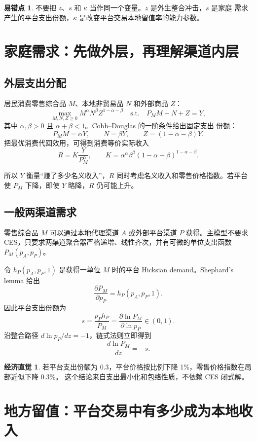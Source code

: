\documentclass[UTF8,11pt,scheme=chinese,fontset=windows]{ctexart}
\theoremstyle{definition}
\newtheorem{intuition}{经济直觉}[section]
\newtheorem{commonerror}{易错点}[section]
\begin{document}
\begin{commonerror}
不要把 \(z\)、\(s\) 和 \(\kappa\) 当作同一个变量。\(z\) 是外生整合冲击，\(s\) 是家庭
需求产生的平台支出份额，\(\kappa\) 是改变平台交易本地留值率的能力参数。
\end{commonerror}

\section{家庭需求：先做外层，再理解渠道内层}

\subsection{外层支出分配}

居民消费零售综合品 \(M\)、本地非贸易品 \(N\) 和外部商品 \(Z\)：
\[
\max_{M,N,Z\geq0}M^\alpha N^\beta Z^{1-\alpha-\beta}
\quad\text{s.t.}\quad P_MM+N+Z=Y,
\]
其中 \(\alpha,\beta>0\) 且 \(\alpha+\beta<1\)。Cobb--Douglas 的一阶条件给出固定支出
份额：
\[
P_MM=\alpha Y,
\qquad N=\beta Y,
\qquad Z=(1-\alpha-\beta)Y.
\]
把最优消费代回效用，可得到消费等价实际收入
\[
R=K\frac{Y}{P_M^\alpha},
\qquad
K=\alpha^\alpha\beta^\beta
(1-\alpha-\beta)^{1-\alpha-\beta}.
\]

所以 \(Y\) 衡量“赚了多少名义收入”，\(R\) 同时考虑名义收入和零售价格指数。若平台使
\(P_M\) 下降，即使 \(Y\) 略降，\(R\) 仍可能上升。

\subsection{一般两渠道需求}

零售综合品 \(M\) 可以通过本地代理渠道 \(A\) 或外部平台渠道 \(P\) 获得。主模型不要求
CES，只要求两渠道聚合器严格递增、线性齐次，并有可微的单位支出函数
\(P_M(p_A,p_P)\)。

令 \(h_P(p_A,p_P,1)\) 是获得一单位 \(M\) 时的平台 Hicksian demand。Shephard's lemma
给出
\[
\frac{\partial P_M}{\partial p_P}=h_P(p_A,p_P,1).
\]
因此平台支出份额为
\[
s
=\frac{p_Ph_P}{P_M}
=\frac{\partial\ln P_M}{\partial\ln p_P}
\in(0,1).
\]
沿整合路径 \(d\ln p_P/dz=-1\)，链式法则立即得到
\[
\boxed{\frac{d\ln P_M}{dz}=-s.}
\]

\begin{intuition}
若平台支出份额为 0.3，平台价格按比例下降 1\%，零售价格指数在局部近似下降 0.3\%。
这个结论来自支出最小化和包络性质，不依赖 CES 闭式解。
\end{intuition}

\section{地方留值：平台交易中有多少成为本地收入}
\end{document}
